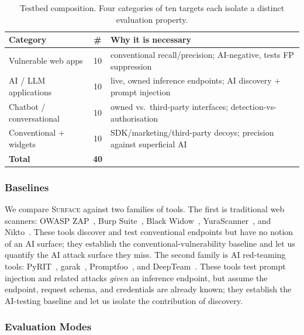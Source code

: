 \begin{table}[t]
\centering
\caption{Testbed composition. Four categories of ten targets each isolate a
distinct evaluation property.}
\label{tab:categories}
\small
\begin{tabular}{@{}lcp{3.4cm}@{}}
\toprule
\textbf{Category} & \textbf{\#} & \textbf{Why it is necessary} \\
\midrule
Vulnerable web apps        & 10 & conventional recall/precision; AI-negative, tests FP suppression \\
AI / LLM applications      & 10 & live, owned inference endpoints; AI discovery + prompt injection \\
Chatbot / conversational   & 10 & owned vs.\ third-party interfaces; detection-vs-authorisation \\
Conventional + widgets     & 10 & SDK/marketing/third-party decoys; precision against superficial AI \\
\midrule
\textbf{Total}             & \textbf{40} & \\
\bottomrule
\end{tabular}
\end{table}

\subsubsection{Baselines}
\label{sec:eval:baselines}

We compare \textsc{Surface} against two families of tools. The first is
traditional web scanners: OWASP ZAP~\cite{zap}, Burp Suite~\cite{burp}, Black
Widow~\cite{blackwidow}, YuraScanner~\cite{yurascanner}, and
Nikto~\cite{nikto}. These tools discover and test conventional endpoints but
have no notion of an AI surface; they establish the conventional-vulnerability
baseline and let us quantify the AI attack surface they miss. The second family
is AI red-teaming tools: PyRIT~\cite{pyrit}, garak~\cite{garak},
Promptfoo~\cite{promptfoo}, and DeepTeam~\cite{deepteam}. These tools test
prompt injection and related attacks \emph{given} an inference endpoint, but
assume the endpoint, request schema, and credentials are already known; they
establish the AI-testing baseline and let us isolate the contribution of
discovery.

\subsubsection{Evaluation Modes}
\label{sec:eval:modes}

